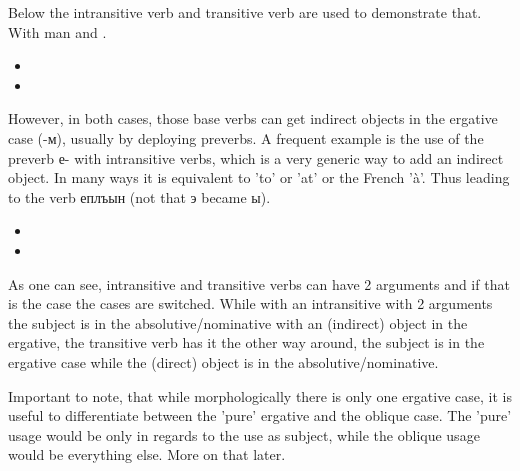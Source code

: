 \documentclass[a4paper, 10pt]{book}
\begin{document}
Below the intransitive verb  and transitive verb  are used to demonstrate that. With  man and .

\begin{itemize}
    \item {}
    \item {}
\end{itemize}

However, in both cases, those base verbs can get indirect objects in the ergative case (-м), usually by deploying preverbs. A frequent example is the use of the preverb е- with intransitive verbs, which is a very generic way to add an indirect object. In many ways it is equivalent to 'to' or 'at' or the French 'à'. Thus leading to the verb еплъын (not that э became ы).


\begin{itemize}
    \item {}
    \item {}
\end{itemize}

As one can see, intransitive and transitive verbs can have 2 arguments and if that is the case the cases are switched. While with an intransitive with 2 arguments the subject is in the absolutive/nominative with an (indirect) object in the ergative, the transitive verb has it the other way around, the subject is in the ergative case while the (direct) object is in the absolutive/nominative. 

Important to note, that while morphologically there is only one ergative case, it is useful to differentiate between the 'pure' ergative and the oblique case. The 'pure' usage would be only in regards to the use as subject, while the oblique usage would be everything else. More on that later.
\end{document}
